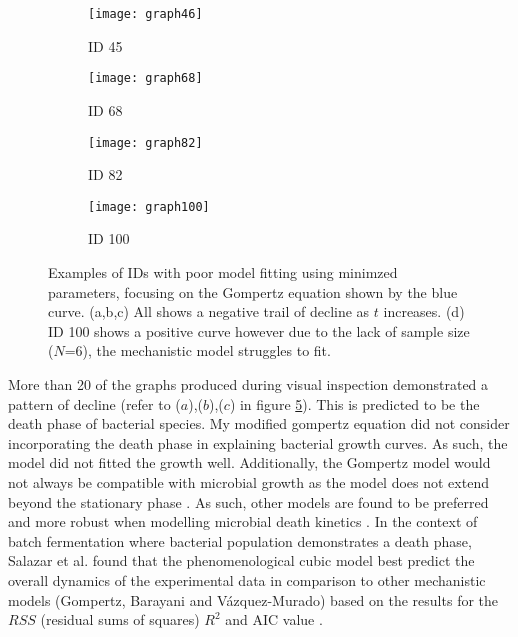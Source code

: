 \documentclass[11pt]{article}
\begin{document}
\begin{figure}[ht]
    \begin{subfigure}[b]{0.5\linewidth}
        \centering
        \texttt{[image: graph46]}
        \caption{ID 45}
        \label{fig3:a}
        \vspace{4ex}
    \end{subfigure}%
    \begin{subfigure}[b]{0.5\linewidth}
        \centering
        \texttt{[image: graph68]}
        \caption{ID 68}
        \label{fig3:b}
        \vspace{4ex}
    \end{subfigure}
    \begin{subfigure}[b]{0.5\linewidth}
        \centering
        \texttt{[image: graph82]}
        \caption{ID 82}
        \label{fig3:c}
        \vspace{4ex}
    \end{subfigure}%
    \begin{subfigure}[b]{0.5\linewidth}
        \centering
        \texttt{[image: graph100]}
        \caption{ID 100}
        \label{fig3:d}
        \vspace{4ex}  
    \end{subfigure}
    \caption{Examples of IDs with poor model fitting using minimzed parameters, focusing on the Gompertz equation shown by the blue curve. (a,b,c) All shows a negative trail of decline as $t$ increases. 
    (d) ID 100 shows a positive curve however due to the lack of sample size ($N$=6), the mechanistic model struggles to fit.}
    \label{fig:fig3}
\end{figure}

More than 20 of the graphs produced during visual inspection demonstrated a pattern of decline (refer to ($a$),($b$),($c$) in figure \ref{fig:fig3}). This is predicted to be the death phase of 
bacterial species. My modified gompertz equation did not consider incorporating the death phase in explaining bacterial growth curves. As such, 
the model did not fitted the growth well. Additionally, the Gompertz model would not always be compatible
with microbial growth as the model does not extend beyond the stationary phase \cite{gibson_predicting_1988,xiong_comparison_1999}. As such, other models are found to be preferred and more
robust when modelling microbial death kinetics \cite{xiong_comparison_1999}. In the context of batch fermentation where bacterial population demonstrates a death phase,
Salazar et al. found that the phenomenological cubic model best predict the overall dynamics of the experimental data in comparison to other mechanistic
models (Gompertz, Barayani and Vázquez-Murado) based on the results for the $RSS$ (residual sums of squares) $R^{2}$ and AIC value \cite{salazar_primary_2021}.
\end{document}

